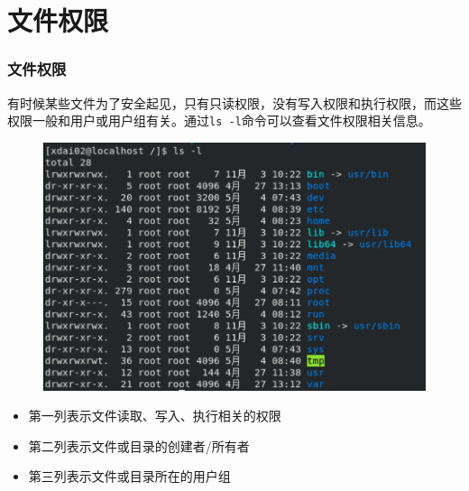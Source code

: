 \documentclass[12pt, openany, oneside]{book}
\begin{document}
\begin{table}[H]
	\centering
	\caption{\lstinline|userdel|参数说明}
\end{table}

\newpage

\section{文件权限}

\subsubsection{文件权限}

有时候某些文件为了安全起见，只有只读权限，没有写入权限和执行权限，而这些权限一般和用户或用户组有关。通过\lstinline|ls -l|命令可以查看文件权限相关信息。

\begin{figure}[H]
	\centering
	\includegraphics[scale=0.7]{img/C5/5-2/1.png}
\end{figure}

\begin{itemize}
	\item 第一列表示文件读取、写入、执行相关的权限

	\item 第二列表示文件或目录的创建者/所有者

	\item 第三列表示文件或目录所在的用户组
\end{itemize}
\end{document}
